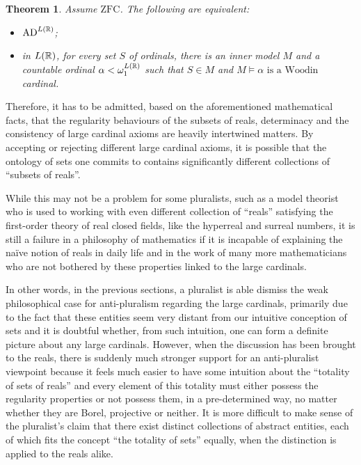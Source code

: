 \documentclass[12pt]{article}
\theoremstyle{plain}
\newtheorem{theorem}{Theorem}[section]
\theoremstyle{definition}
\newcommand{\ZFC}{\mathrm{ZFC}}
\newcommand{\AD}{\mathrm{AD}}
\begin{document}
\begin{theorem}
	\label{thm:adlr-determinacy-equivalence}
	Assume $\ZFC$. The following are equivalent:
	\begin{itemize}
		\item $\AD^{L\mleft(\mathbb{R}\mright)}$;
		\item in $L\mleft(\mathbb{R}\mright)$, for every set $S$ of ordinals, there is an inner model $M$ and a countable ordinal $\alpha < \omega_1^{L\mleft(\mathbb{R}\mright)}$ such that $S \in M$ and $M \vDash \text{$\alpha$ is a Woodin}$ cardinal.
	\end{itemize}
\end{theorem}

Therefore, it has to be admitted, based on the aforementioned mathematical facts, that the regularity behaviours of the subsets of reals, determinacy and the consistency of large cardinal axioms are heavily intertwined matters. By accepting or rejecting different large cardinal axioms, it is possible that the ontology of sets one commits to contains significantly different collections of ``subsets of reals''.

While this may not be a problem for some pluralists, such as a model theorist who is used to working with even different collection of ``reals'' satisfying the first-order theory of real closed fields, like the hyperreal and surreal numbers, it is still a failure in a philosophy of mathematics if it is incapable of explaining the na\"ive notion of reals in daily life and in the work of many more mathematicians who are not bothered by these properties linked to the large cardinals.

In other words, in the previous sections, a pluralist is able dismiss the weak philosophical case for anti-pluralism regarding the large cardinals, primarily due to the fact that these entities seem very distant from our intuitive conception of sets and it is doubtful whether, from such intuition, one can form a definite picture about any large cardinals. However, when the discussion has been brought to the reals, there is suddenly much stronger support for an anti-pluralist viewpoint because it feels much easier to have some intuition about the ``totality of sets of reals'' and every element of this totality must either possess the regularity properties or not possess them, in a pre-determined way, no matter whether they are Borel, projective or neither. It is more difficult to make sense of the pluralist's claim that there exist distinct collections of abstract entities, each of which fits the concept ``the totality of sets'' equally, when the distinction is applied to the reals alike.
\end{document}
